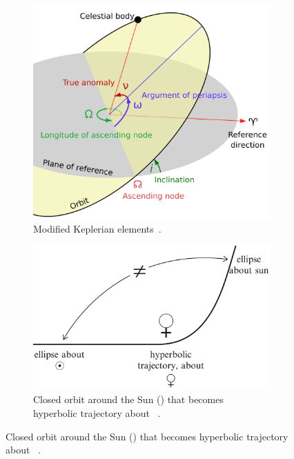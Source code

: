 \begin{figure}[htb]
    \centering
    \begin{subfigure}[b]{0.47\textwidth}
        \includegraphics[width=\textwidth]{doc/thesis/0_figures/Orbit_elements.png}
        \caption{Modified Keplerian elements~\cite{Commons2019File:Orbit1.svgRepository}.}
        \label{fig:kepler_elements}
    \end{subfigure}
    \begin{subfigure}[b]{0.47\textwidth}
        \centering
        \includegraphics[width=\textwidth]{doc/thesis/0_figures/Hyperbolic_trajectory.png}
        \caption{Closed orbit around the Sun (\astrosun) that becomes hyperbolic trajectory about \venus~\cite{Hintz2015FundamentalsAstrodynamics}.}
        \label{fig:hyperbolic_orbit}
    \end{subfigure}
\end{figure}
    

